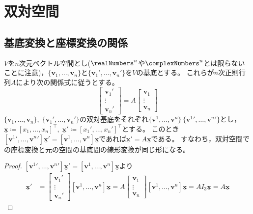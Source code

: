 \chapter{双対空間}
    \section{基底変換と座標変換の関係}
        \begin{shadebox}
            $V$を$n$次元ベクトル空間とし($\realNumbers^n$や$\complexNumbers^n$とは限らないことに注意)，$\{\bm{v}_1,\dotsc,\bm{v}_n\}$と$\{{\bm{v}_1}',\dotsc,{\bm{v}_n}'\}$を$V$の基底とする。
            これらが$n$次正則行列$A$により次の関係式に従うとする。
            \[
                \begin{bmatrix}
                    {\bm{v}_1}' \\
                    \vdots \\
                    {\bm{v}_n}'
                \end{bmatrix}
                = A
                \begin{bmatrix}
                    \bm{v}_1 \\
                    \vdots \\
                    \bm{v}_n
                \end{bmatrix}
            \]
            $\{\bm{v}_1,\dotsc,\bm{v}_n\},\;\{{\bm{v}_1}',\dotsc,{\bm{v}_n}'\}$の双対基底をそれぞれ$\{\bm{v}^1,\dotsc,\bm{v}^n\}\,\{{\bm{v}^1}',\dotsc,{\bm{v}^n}'\}$とし，
            $\underline{\bm{x}} \coloneq [x_1,\dotsc,x_n]^\top,\;\underline{\bm{x}}' \coloneq [{x_1}',\dotsc,{x_n}']^\top$とする。
            このとき$[{\bm{v}^1}',\dotsc,{\bm{v}^n}']\underline{\bm{x}}' = [\bm{v}^1,\dotsc,\bm{v}^n]\underline{\bm{x}}$であれば$\underline{\bm{x}}' = A\underline{\bm{x}}$である。
            すなわち，双対空間での座標変換と元の空間の基底間の線形変換が同じ形になる。
        \end{shadebox}
        \begin{proof}
            \quad\par
            $[{\bm{v}^1}',\dotsc,{\bm{v}^n}']\underline{\bm{x}}' = [\bm{v}^1,\dotsc,\bm{v}^n]\underline{\bm{x}}$より
            \begin{align*}
                \underline{\bm{x}}' &= 
                \begin{bmatrix}
                    {\bm{v}_1}' \\
                    \vdots \\
                    {\bm{v}_n}'
                \end{bmatrix}
                [\bm{v}^1,\dotsc,\bm{v}^n]\underline{\bm{x}} = A
                \begin{bmatrix}
                    \bm{v}_1 \\
                    \vdots \\
                    \bm{v}_n
                \end{bmatrix}
                [\bm{v}^1,\dotsc,\bm{v}^n]\underline{\bm{x}} = A I_3\underline{\bm{x}} = A\underline{\bm{x}}
            \end{align*}
        \end{proof}